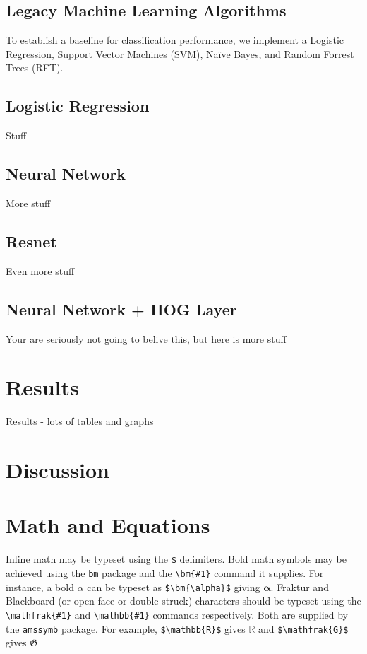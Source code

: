 \documentclass[%
 aip,
 jmp,%
 amsmath,amssymb,
 reprint,%
]{revtex4-1}
\begin{document}
\subsection{\label{sec:level2}Legacy Machine Learning Algorithms}
To establish a baseline for classification performance, we implement a Logistic Regression, Support Vector Machines (SVM), Naïve Bayes, and Random Forrest Trees (RFT).


\subsection{\label{sec:level2}Logistic Regression}

Stuff

\subsection{\label{sec:level2}Neural Network}

More stuff

\subsection{\label{sec:level2}Resnet}

Even more stuff

\subsection{\label{sec:level2}Neural Network + HOG Layer}

Your are seriously not going to belive this, but here is more stuff






\section{Results}

Results - lots of tables and graphs


\section{Discussion}




\section{Math and Equations}
Inline math may be typeset using the \verb+$+ delimiters. Bold math
symbols may be achieved using the \verb+bm+ package and the
\verb+\bm{#1}+ command it supplies. For instance, a bold $\alpha$ can
be typeset as \verb+$\bm{\alpha}$+ giving $\bm{\alpha}$. Fraktur and
Blackboard (or open face or double struck) characters should be
typeset using the \verb+\mathfrak{#1}+ and \verb+\mathbb{#1}+ commands
respectively. Both are supplied by the \texttt{amssymb} package. For
example, \verb+$\mathbb{R}$+ gives $\mathbb{R}$ and
\verb+$\mathfrak{G}$+ gives $\mathfrak{G}$
\end{document}
